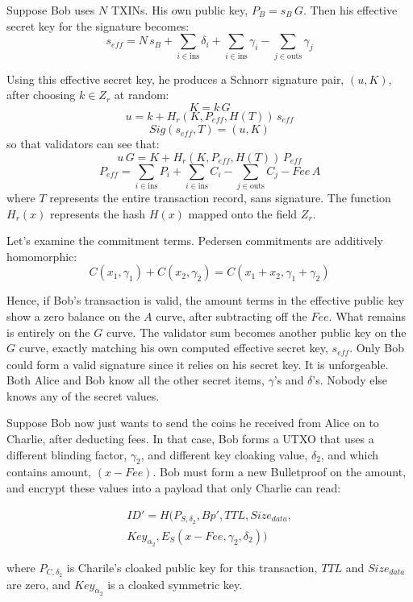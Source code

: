 \documentclass[a4paper, 10pt, conference]{ieeeconf}
\begin{document}
Suppose Bob uses $N$ TXINs. His own public key, $P_B = s_B \, G$. Then his effective secret key for the signature becomes:
$$s_{\mathit{eff}} = N \, s_B + \sum_{i \in \text{ins}} {\delta_i} + \sum_{i \in \text{ins}}{\gamma_i} - \sum_{j \in \text{outs}}{ \gamma_j}$$

Using this effective secret key, he produces a Schnorr signature pair, $(u, K)$, after choosing $k \in Z_r$ at random:
$$K = k \, G$$
$$u = k + H_r(K, P_{eff}, H(T)) \, s_{\mathit{eff}}$$
$$Sig(s_{eff},T) = (u, K)$$
so that validators can see that:
$$u \, G = K + H_r(K, P_{eff}, H(T)) \, P_{eff}$$
$$P_{\mathit{eff}} = \sum_{i \in \text{ins}}{P_i} + \sum_{i \in \text{ins}}{C_i} - \sum_{j \in \text{outs}}{C_j} - \mathit{Fee} \, A$$
where $T$ represents the entire transaction record, sans signature. The function $H_r(x)$ represents the hash $H(x)$ mapped onto the field $Z_r$.

Let's examine the commitment terms. Pedersen commitments are additively homomorphic:
$$C(x_1, \gamma_1) + C(x_2, \gamma_2) = C(x_1 + x_2, \gamma_1 + \gamma_2)$$

Hence, if Bob's transaction is valid, the amount terms in the effective public key show a zero balance on the $A$ curve, after subtracting off the $\mathit{Fee}$. What remains is entirely on the $G$ curve. The validator sum becomes another public key on the $G$ curve, exactly matching his own computed effective secret key, $s_{\mathit{eff}}$. Only Bob could form a valid signature since it relies on his secret key. It is unforgeable. Both Alice and Bob know all the other secret items, $\gamma$'s and $\delta$'s. Nobody else knows any of the secret values.

Suppose Bob now just wants to send the coins he received from Alice on to Charlie, after deducting fees. In that case, Bob forms a UTXO that uses a different blinding factor, $\gamma_2$, and different key cloaking value, $\delta_2$, and which contains amount, $(x - \mathit{Fee})$. Bob must form a new Bulletproof on the amount, and encrypt these values into a payload that only Charlie can read:

\begin{multline*}
ID' = H(P_{S, \delta_2}, Bp', TTL, Size_{data}, \\
          Key_{\alpha_2}, E_S(x - Fee, \gamma_2, \delta_2))
\end{multline*}

where $P_{C, \delta_2}$ is Charile's cloaked public key for this transaction, $TTL$ and $Size_{data}$ are zero, and $Key_{\alpha_2}$ is a cloaked symmetric key. 
\end{document}
